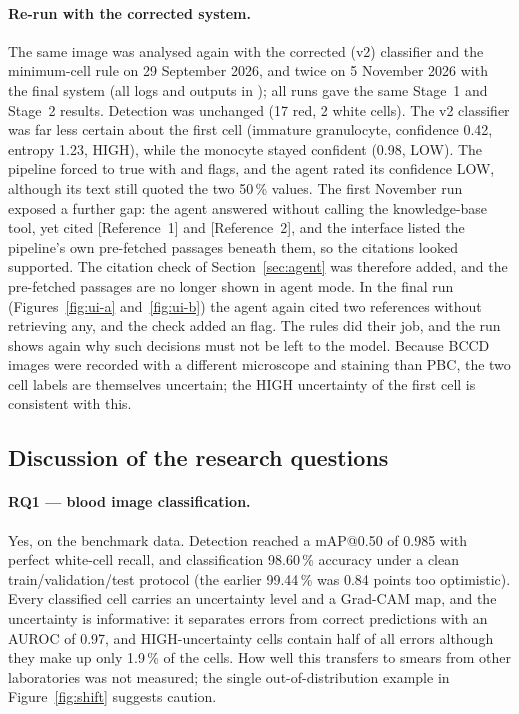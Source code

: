 \paragraph{Re-run with the corrected system.} The same image was analysed again with the corrected (v2) classifier and the minimum-cell rule on 29 September 2026, and twice on 5 November 2026 with the final system (all logs and outputs in ); all runs gave the same Stage~1 and Stage~2 results. Detection was unchanged (17 red, 2 white cells). The v2 classifier was far less certain about the first cell (immature granulocyte, confidence 0.42, entropy 1.23, HIGH), while the monocyte stayed confident (0.98, LOW). The pipeline forced  to true with  and  flags, and the agent rated its confidence LOW, although its text still quoted the two 50\,\% values. The first November run exposed a further gap: the agent answered without calling the knowledge-base tool, yet cited [Reference~1] and [Reference~2], and the interface listed the pipeline's own pre-fetched passages beneath them, so the citations looked supported. The citation check of Section~\ref{sec:agent} was therefore added, and the pre-fetched passages are no longer shown in agent mode. In the final run (Figures~\ref{fig:ui-a} and~\ref{fig:ui-b}) the agent again cited two references without retrieving any, and the check added an  flag. The rules did their job, and the run shows again why such decisions must not be left to the model. Because BCCD images were recorded with a different microscope and staining than PBC, the two cell labels are themselves uncertain; the HIGH uncertainty of the first cell is consistent with this.

\subsection{Discussion of the research questions}

\paragraph{RQ1 --- blood image classification.} Yes, on the benchmark data. Detection reached a mAP@0.50 of 0.985 with perfect white-cell recall, and classification 98.60\,\% accuracy under a clean train/validation/test protocol (the earlier 99.44\,\% was 0.84 points too optimistic). Every classified cell carries an uncertainty level and a Grad-CAM map, and the uncertainty is informative: it separates errors from correct predictions with an AUROC of 0.97, and HIGH-uncertainty cells contain half of all errors although they make up only 1.9\,\% of the cells. How well this transfers to smears from other laboratories was not measured; the single out-of-distribution example in Figure~\ref{fig:shift} suggests caution.

